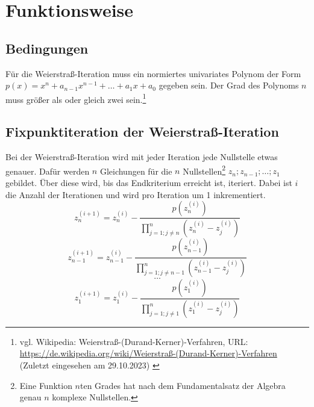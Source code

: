 \documentclass[12pt]{article}
\begin{document}
\section{Funktionsweise}
\subsection{Bedingungen}
Für die Weierstraß-Iteration muss ein normiertes univariates Polynom der Form $p(x) = x^n + a_{n-1} x^{n-1} + \dots + a_1 x + a_0$ gegeben sein. Der Grad des Polynoms $n$ muss größer als oder gleich zwei sein.\footnote{
    vgl. Wikipedia: Weierstraß-(Durand-Kerner)-Verfahren, URL: \url{https://de.wikipedia.org/wiki/Weierstraß-(Durand-Kerner)-Verfahren} (Zuletzt eingesehen am 29.10.2023)
    \label{ftn:Wikipedia-Weierstraß-Methode}
}

\subsection{Fixpunktiteration der Weierstraß-Iteration}
Bei der Weierstraß-Iteration wird mit jeder Iteration jede Nullstelle etwas genauer. Dafür werden $n$ Gleichungen für die $n$ Nullstellen\footnote{Eine Funktion $n$ten Grades hat nach dem Fundamentalsatz der Algebra genau $n$ komplexe Nullstellen.} $z_n;z_{n-1};\dots;z_1$ gebildet. Über diese wird, bis das Endkriterium erreicht ist, iteriert. Dabei ist $i$ die Anzahl der Iterationen und wird pro Iteration um 1 inkrementiert.
\[z_n^{(i+1)} = z_n^{(i)} - \frac{p(z_n^{(i)})}{\prod_{j=1;j\neq n}^{n}(z_n^{(i)}-z_j^{(i)})}\]
\[z_{n-1}^{(i+1)} = z_{n-1}^{(i)} - \frac{p(z_{n-1}^{(i)})}{\prod_{j=1;j\neq n-1}^{n}(z_{n-1}^{(i)}-z_j^{(i)})}\]
\vspace{0.25mm}
\[\dots\]
\[z_{1}^{(i+1)} = z_1^{(i)} - \frac{p(z_{1}^{(i)})}{\prod_{j=1;j\neq 1}^{n}(z_{1}^{(i)}-z_j^{(i)})}\]
\end{document}
